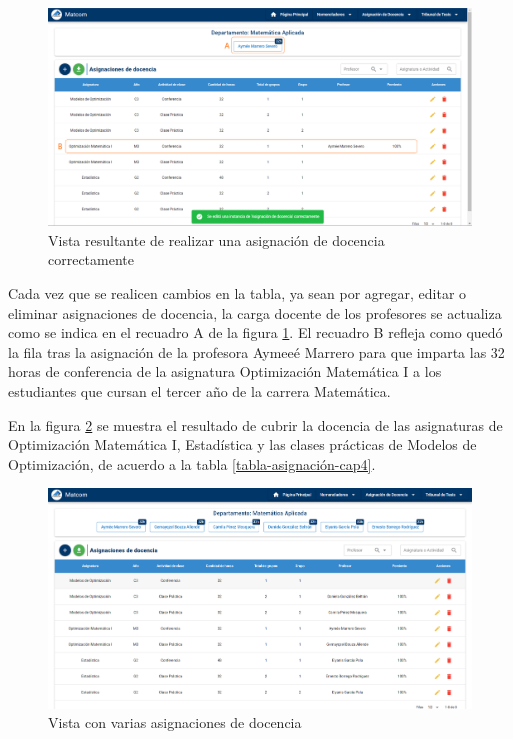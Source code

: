 \begin{figure}[H]
    \includegraphics[scale=0.3]{Graphics/Implementation/Docencia/AD-one-assign.png}
    \caption{Vista resultante de realizar una asignación de docencia correctamente}
    \label{img-ta-one-assign}
\end{figure}



Cada vez que se realicen cambios en la tabla, ya sean por agregar, editar o eliminar 
asignaciones de docencia, la carga docente de los profesores se actualiza como se indica 
en el recuadro A de la figura \ref{img-ta-one-assign}. El recuadro B refleja como quedó la fila tras la asignación de la profesora 
Aymeeé Marrero para que imparta las 32 horas de conferencia de la asignatura Optimización Matemática I
a los estudiantes que cursan el tercer año de la carrera Matemática.


En la figura \ref{img-ta-with-assign} se muestra el resultado de cubrir la docencia de las asignaturas de Optimización
Matemática I, Estadística y las clases prácticas de Modelos de Optimización, de acuerdo a la tabla \ref{tabla-asignación-cap4}.


\begin{figure}[H]
    \includegraphics[scale=0.3]{Graphics/Implementation/Docencia/AD-with-assigns.png}
    \caption{Vista con varias asignaciones de docencia}
    \label{img-ta-with-assign}
\end{figure}


